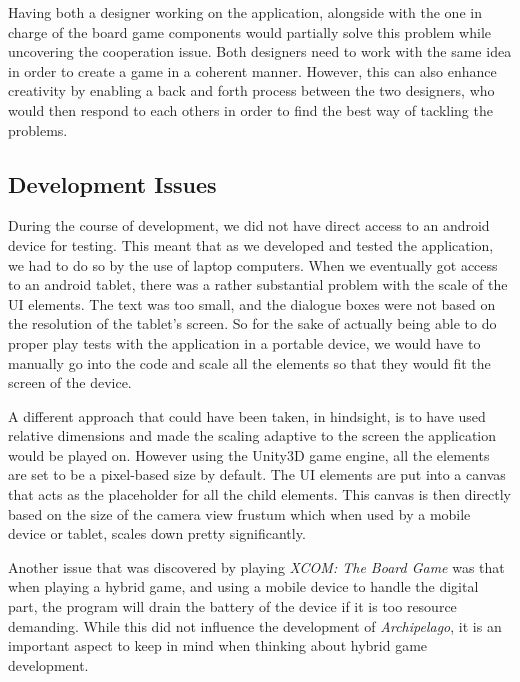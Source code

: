 Having both a designer working on the application, alongside with the one in charge of the board game components would partially solve this problem while uncovering the cooperation issue. Both designers need to work with the same idea in order to create a game in a coherent manner. However, this can also enhance creativity by enabling a back and forth process between the two designers, who would then respond to each others in order to find the best way of tackling the problems. 

\subsection{Development Issues}
During the course of development, we did not have direct access to an android device for testing. This meant that as we developed and tested the application, we had to do so by the use of laptop computers. When we eventually got access to an android tablet, there was a rather substantial problem with the scale of the UI elements. The text was too small, and the dialogue boxes were not based on the resolution of the tablet's screen. So for the sake of actually being able to do proper play tests with the application in a portable device, we would have to manually go into the code and scale all the elements so that they would fit the screen of the device. 

A different approach that could have been taken, in hindsight, is to have used relative dimensions and made the scaling adaptive to the screen the application would be played on. However using the Unity3D game engine, all the elements are set to be a pixel-based size by default. The UI elements are put into a canvas that acts as the placeholder for all the child elements. This canvas is then directly based on the size of the camera view frustum which when used by a mobile device or tablet, scales down pretty significantly. 

Another issue that was discovered by playing \textit{XCOM: The Board Game} \cite{game:xcomtbg} was that when playing a hybrid game, and using a mobile device to handle the digital part, the program will drain the battery of the device if it is too resource demanding. While this did not influence the development of \textit{Archipelago}, it is an important aspect to keep in mind when thinking about hybrid game development.

